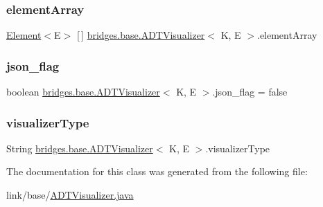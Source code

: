 \hypertarget{classbridges_1_1base_1_1_a_d_t_visualizer_a320739b4be463d3987b3de2463b0d592}{}\label{classbridges_1_1base_1_1_a_d_t_visualizer_a320739b4be463d3987b3de2463b0d592} 
\subsubsection{\texorpdfstring{element\+Array}{elementArray}}
{\footnotesize\ttfamily \hyperlink{classbridges_1_1base_1_1_element}{Element}$<$E$>$ \mbox{[}$\,$\mbox{]} \hyperlink{classbridges_1_1base_1_1_a_d_t_visualizer}{bridges.\+base.\+A\+D\+T\+Visualizer}$<$ K, E $>$.element\+Array}

\hypertarget{classbridges_1_1base_1_1_a_d_t_visualizer_abf75be63a37f31ada7f92a84bb1bc536}{}\label{classbridges_1_1base_1_1_a_d_t_visualizer_abf75be63a37f31ada7f92a84bb1bc536} 
\subsubsection{\texorpdfstring{json\+\_\+flag}{json\_flag}}
{\footnotesize\ttfamily boolean \hyperlink{classbridges_1_1base_1_1_a_d_t_visualizer}{bridges.\+base.\+A\+D\+T\+Visualizer}$<$ K, E $>$.json\+\_\+flag = false\hspace{0.3cm}{\ttfamily [protected]}}

\hypertarget{classbridges_1_1base_1_1_a_d_t_visualizer_a288aece657b5641f48e839b34f3884b9}{}\label{classbridges_1_1base_1_1_a_d_t_visualizer_a288aece657b5641f48e839b34f3884b9} 
\subsubsection{\texorpdfstring{visualizer\+Type}{visualizerType}}
{\footnotesize\ttfamily String \hyperlink{classbridges_1_1base_1_1_a_d_t_visualizer}{bridges.\+base.\+A\+D\+T\+Visualizer}$<$ K, E $>$.visualizer\+Type}



The documentation for this class was generated from the following file\+:\begin{DoxyCompactItemize}
\item 
link/base/\hyperlink{_a_d_t_visualizer_8java}{A\+D\+T\+Visualizer.\+java}\end{DoxyCompactItemize}
